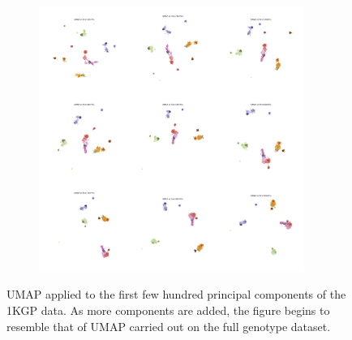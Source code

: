 \documentclass[12pt]{pnas-new}
\begin{document}
\begin{figure}
    \centering
    \begin{subfigure}{0.95\textwidth}
    \includegraphics[width=0.95\textwidth]{images/montage_1KGP_umap_convergence_resize.jpeg}
    \end{subfigure}
    \caption{UMAP applied to the first few hundred principal components of the 1KGP data. As more components are added, the figure begins to resemble that of UMAP carried out on the full genotype dataset.}
    \label{fig:supp_montage_1kgp_converge}
\end{figure}
\end{document}
